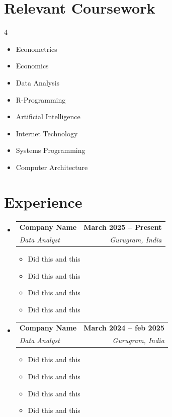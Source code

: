 \documentclass[letterpaper,11pt]{article}
\makeatletter
\newcommand{\resumeItem}[1]{
  \item\small{
    {#1 \vspace{-2pt}}
  }
}
\newcommand{\resumeSubheading}[4]{
  \vspace{-2pt}\item
    \begin{tabular*}{1.0\textwidth}[t]{l@{\extracolsep{\fill}}r}
      \textbf{#1} & \textbf{\small #2} \\
      \textit{\small#3} & \textit{\small #4} \\
    \end{tabular*}\vspace{-7pt}
}
\newcommand{\resumeSubHeadingListStart}{\begin{itemize}[leftmargin=0.0in, label={}]}
\newcommand{\resumeSubHeadingListEnd}{\end{itemize}}
\newcommand{\resumeItemListStart}{\begin{itemize}}
\newcommand{\resumeItemListEnd}{\end{itemize}\vspace{-5pt}}
\makeatother
\begin{document}
\section{Relevant Coursework}
        \begin{multicols}{4}
            \begin{itemize}[itemsep=-5pt, parsep=3pt]
                \item\small Econometrics
                \item Economics
                \item Data Analysis
                \item R-Programming
                \item Artificial Intelligence
                \item Internet Technology
                \item Systems Programming
                \item Computer Architecture
            \end{itemize}
        \end{multicols}
        \vspace*{2.0\multicolsep}

\section{Experience}
  \resumeSubHeadingListStart

    \resumeSubheading
      {Company Name}{March 2025 -- Present}
      {Data Analyst}{Gurugram, India}
      \resumeItemListStart
        \resumeItem{Did this and this}
        \resumeItem{Did this and this}
        \resumeItem{Did this and this}
        \resumeItem{Did this and this}
   
      \resumeItemListEnd

     \resumeSubheading
      {Company Name}{March 2024 -- feb 2025}
      {Data Analyst}{Gurugram, India}
      \resumeItemListStart
        \resumeItem{Did this and this}
        \resumeItem{Did this and this}
        \resumeItem{Did this and this}
        \resumeItem{Did this and this}
   
      \resumeItemListEnd
    
  \resumeSubHeadingListEnd
\vspace{-10pt}

\end{document}
